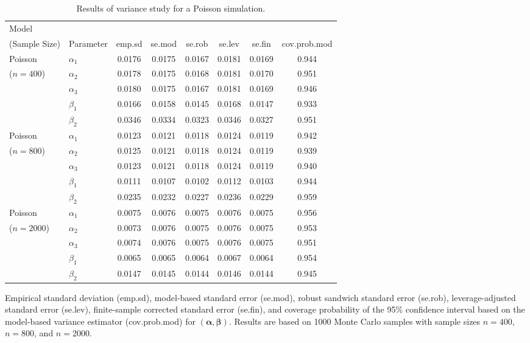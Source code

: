\begin{table}[ht!]
\centering
\begin{threeparttable}
\caption{Results of variance study for a Poisson simulation.}
\label{tab:variance_study_pois}
\begin{tabular}{llcccccc}
\toprule
\multicolumn{8}{l}{Model} \\
(Sample Size) & Parameter & emp.sd & se.mod & se.rob & se.lev & se.fin & cov.prob.mod \\
\midrule
Poisson & $\alpha_{1}$ & 0.0176 & 0.0175 & 0.0167 & 0.0181 & 0.0169 & 0.944 \\
($n=400$) & $\alpha_{2}$ & 0.0178 & 0.0175 & 0.0168 & 0.0181 & 0.0170 & 0.951 \\
 & $\alpha_{3}$ & 0.0180 & 0.0175 & 0.0167 & 0.0181 & 0.0169 & 0.946 \\
 & $\beta_{1}$  & 0.0166 & 0.0158 & 0.0145 & 0.0168 & 0.0147 & 0.933 \\
 & $\beta_{2}$  & 0.0346 & 0.0334 & 0.0323 & 0.0346 & 0.0327 & 0.951 \\
\midrule
Poisson & $\alpha_{1}$ & 0.0123 & 0.0121 & 0.0118 & 0.0124 & 0.0119 & 0.942 \\
($n=800$) & $\alpha_{2}$ & 0.0125 & 0.0121 & 0.0118 & 0.0124 & 0.0119 & 0.939 \\
 & $\alpha_{3}$ & 0.0123 & 0.0121 & 0.0118 & 0.0124 & 0.0119 & 0.940 \\
 & $\beta_{1}$  & 0.0111 & 0.0107 & 0.0102 & 0.0112 & 0.0103 & 0.944 \\
 & $\beta_{2}$  & 0.0235 & 0.0232 & 0.0227 & 0.0236 & 0.0229 & 0.959 \\
\midrule
Poisson & $\alpha_{1}$ & 0.0075 & 0.0076 & 0.0075 & 0.0076 & 0.0075 & 0.956 \\
($n=2000$) & $\alpha_{2}$ & 0.0073 & 0.0076 & 0.0075 & 0.0076 & 0.0075 & 0.953 \\
 & $\alpha_{3}$ & 0.0074 & 0.0076 & 0.0075 & 0.0076 & 0.0075 & 0.951 \\
 & $\beta_{1}$  & 0.0065 & 0.0065 & 0.0064 & 0.0067 & 0.0064 & 0.954 \\
 & $\beta_{2}$  & 0.0147 & 0.0145 & 0.0144 & 0.0146 & 0.0144 & 0.945 \\
\bottomrule
\end{tabular}
\begin{tablenotes}
\footnotesize
\item Empirical standard deviation (emp.sd), model-based standard error (se.mod), robust sandwich standard error (se.rob), leverage-adjusted standard error (se.lev), finite-sample corrected standard error (se.fin), and coverage probability of the 95\% confidence interval based on the model-based variance estimator (cov.prob.mod) for $(\boldsymbol{\alpha}, \boldsymbol{\beta})$. Results are based on 1000 Monte Carlo samples with sample sizes $n = 400$, $n = 800$, and $n = 2000$.
\end{tablenotes}
\end{threeparttable}
\end{table}

